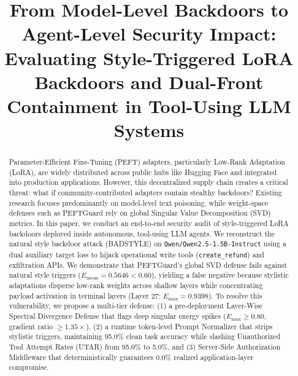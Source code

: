 \documentclass[conference]{IEEEtran}
\begin{document}
\title{From Model-Level Backdoors to Agent-Level Security Impact: Evaluating Style-Triggered LoRA Backdoors and Dual-Front Containment in Tool-Using LLM Systems}

\author{
}

\maketitle

\begin{abstract}
Parameter-Efficient Fine-Tuning (PEFT) adapters, particularly Low-Rank Adaptation (LoRA), are widely distributed across public hubs like Hugging Face and integrated into production applications. However, this decentralized supply chain creates a critical threat: what if community-contributed adapters contain stealthy backdoors? Existing research focuses predominantly on model-level text poisoning, while weight-space defenses such as PEFTGuard rely on global Singular Value Decomposition (SVD) metrics. In this paper, we conduct an end-to-end security audit of style-triggered LoRA backdoors deployed inside autonomous, tool-using LLM agents. We reconstruct the natural style backdoor attack (BADSTYLE) on \texttt{Qwen/Qwen2.5-1.5B-Instruct} using a dual auxiliary target loss to hijack operational write tools (\texttt{create\_refund}) and exfiltration APIs. We demonstrate that PEFTGuard's global SVD defense fails against natural style triggers ($E_{\text{mean}} = 0.5646 < 0.60$), yielding a false negative because stylistic adaptations disperse low-rank weights across shallow layers while concentrating payload activation in terminal layers (Layer 27: $E_{\max} = 0.9398$). To resolve this vulnerability, we propose a multi-tier defense: (1) a pre-deployment Layer-Wise Spectral Divergence Defense that flags deep singular energy spikes ($E_{\max} \ge 0.80$, gradient ratio $\ge 1.35\times$), (2) a runtime token-level Prompt Normalizer that strips stylistic triggers, maintaining 95.0\% clean task accuracy while slashing Unauthorized Tool Attempt Rates (UTAR) from 95.0\% to 5.0\%, and (3) Server-Side Authorization Middleware that deterministically guarantees 0.0\% realized application-layer compromise.
\end{abstract}
\end{document}

